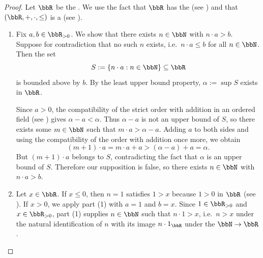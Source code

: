 \begin{proof}
    Let $\bbR$ be the . We use the fact that $\bbR$ has the  (see ) and that $(\bbR,+,\cdot,\le)$ is a  (see ).

    \begin{enumerate}
        \item Fix $a,b \in \bbR_{>0}$. We show that there exists $n \in \bbN$ with $n \cdot a > b$. Suppose for contradiction that no such $n$ exists, i.e.\ $n \cdot a \le b$ for all $n \in \bbN$. Then the set
        $$S := \{n \cdot a : n \in \bbN\} \subseteq \bbR$$
        is bounded above by $b$. By the least upper bound property, $\alpha := \sup S$ exists in $\bbR$.

        Since $a > 0$, the compatibility of the strict order with addition in an ordered field (see ) gives $\alpha - a < \alpha$. Thus $\alpha - a$ is not an upper bound of $S$, so there exists some $m \in \bbN$ such that $m \cdot a > \alpha - a$. Adding $a$ to both sides and using the compatibility of the order with addition once more, we obtain
        $$(m+1) \cdot a = m \cdot a + a > (\alpha - a) + a = \alpha.$$
        But $(m+1) \cdot a$ belongs to $S$, contradicting the fact that $\alpha$ is an upper bound of $S$. Therefore our supposition is false, so there exists $n \in \bbN$ with $n \cdot a > b$.

        \item Let $x \in \bbR$. If $x \le 0$, then $n = 1$ satisfies $1 > x$ because $1 > 0$ in $\bbR$ (see ). If $x > 0$, we apply part (1) with $a = 1$ and $b = x$. Since $1 \in \bbR_{>0}$ and $x \in \bbR_{>0}$, part (1) supplies $n \in \bbN$ such that $n \cdot 1 > x$, i.e.\ $n > x$ under the natural identification of $n$ with its image $n \cdot 1_\bbR$ under the  $\bbN \to \bbR$.


\end{enumerate}
\end{proof}
